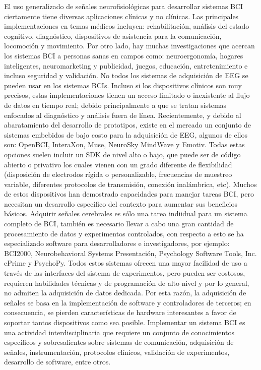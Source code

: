El uso generalizado de señales neurofisiológicas para desarrollar sistemas \gls*{BCI} ciertamente tiene diversas aplicaciones clínicas y no clínicas. Las principales implementaciones en temas médicos incluyen: rehabilitación, análisis del estado cognitivo, diagnóstico, dispositivos de asistencia para la comunicación, locomoción y movimiento. Por otro lado, hay muchas investigaciones que acercan los sistemas \gls*{BCI} a personas sanas en campos como: neuroergonomía, hogares inteligentes, neuromarketing y publicidad, juegos, educación, entretenimiento e incluso seguridad y validación. No todos los sistemas de adquisición de EEG se pueden usar en los sistemas \gls*{BCI}s. Incluso si los dispositivos clínicos son muy precisos, estas implementaciones tienen un acceso limitado o inexistente al flujo de datos en tiempo real; debido principalmente a que se tratan sistemas enfocados al diagnóstico y análisis fuera de línea. Recientemente, y debido al abaratamiento del desarrollo de prototipos, existe en el mercado un conjunto de sistemas embebidos de bajo costo para la adquisición de \gls*{EEG}, algunos de ellos son: OpenBCI, InteraXon, Muse, NeuroSky MindWave y Emotiv. Todas estas opciones suelen incluir un \gls*{SDK} de nivel alto o bajo, que puede ser de código abierto o privativo los cuales vienen con un grado diferente de flexibilidad (disposición de electrodos rígida o personalizable, frecuencias de muestreo variable, diferentes protocolos de transmisión, conexión inalámbrica, etc). Muchos de estos dispositivos han demostrado capacidades para manejar tareas \gls*{BCI}, pero necesitan un desarrollo específico del contexto para aumentar sus beneficios básicos. Adquirir señales cerebrales es sólo una tarea indiidual para un sistema completo de \gls*{BCI}, también es necesario llevar a cabo una gran cantidad de procesamiento de datos y experimentos controlados, con respecto a esto se ha especializado software para desarrolladores e investigadores, por ejemplo: BCI2000, Neurobehavioral Systems Presentación, Psychology Software Tools, Inc. ePrime y PsychoPy. Todos estos sistemas ofrecen una mayor facilidad de uso a través de las interfaces del sistema de experimentos, pero pueden ser costosos, requieren habilidades técnicas y de programación de alto nivel y por lo general, no admiten la adquisición de datos dedicada. Por esta razón, la adquisición de señales se basa en la implementación de software y controladores de terceros; en consecuencia, se pierden características de hardware interesantes a favor de soportar tantos dispositivos como sea posible. Implementar un sistema \gls*{BCI} es una actividad interdisciplinaria que requiere un conjunto de conocimientos específicos y sobresalientes sobre sistemas de comunicación, adquisición de señales, instrumentación, protocolos clínicos, validación de experimentos, desarrollo de software, entre otros.\\


